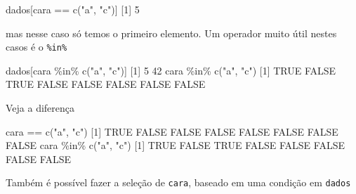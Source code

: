\documentclass[
  10pt,
  a4paper]{book}
\newenvironment{Shaded}{\begin{snugshade}}{\end{snugshade}}
\newcommand{\ConstantTok}[1]{\textcolor[rgb]{0.00,0.00,0.00}{#1}}
\newcommand{\DecValTok}[1]{\textcolor[rgb]{0.00,0.00,0.81}{#1}}
\newcommand{\FunctionTok}[1]{\textcolor[rgb]{0.00,0.00,0.00}{#1}}
\newcommand{\NormalTok}[1]{#1}
\newcommand{\SpecialCharTok}[1]{\textcolor[rgb]{0.00,0.00,0.00}{#1}}
\newcommand{\StringTok}[1]{\textcolor[rgb]{0.31,0.60,0.02}{#1}}
\begin{document}
\begin{Shaded}
\begin{Highlighting}[]
\NormalTok{dados[cara }\SpecialCharTok{==} \FunctionTok{c}\NormalTok{(}\StringTok{"a"}\NormalTok{, }\StringTok{"c"}\NormalTok{)]}
\NormalTok{[}\DecValTok{1}\NormalTok{] }\DecValTok{5}
\end{Highlighting}
\end{Shaded}

mas nesse caso só temos o primeiro elemento. Um operador muito útil
nestes casos é o \texttt{\%in\%}

\begin{Shaded}
\begin{Highlighting}[]
\NormalTok{dados[cara }\SpecialCharTok{\%in\%} \FunctionTok{c}\NormalTok{(}\StringTok{"a"}\NormalTok{, }\StringTok{"c"}\NormalTok{)]}
\NormalTok{[}\DecValTok{1}\NormalTok{]  }\DecValTok{5} \DecValTok{42}
\NormalTok{cara }\SpecialCharTok{\%in\%} \FunctionTok{c}\NormalTok{(}\StringTok{"a"}\NormalTok{, }\StringTok{"c"}\NormalTok{)}
\NormalTok{[}\DecValTok{1}\NormalTok{]  }\ConstantTok{TRUE} \ConstantTok{FALSE}  \ConstantTok{TRUE} \ConstantTok{FALSE} \ConstantTok{FALSE} \ConstantTok{FALSE} \ConstantTok{FALSE} \ConstantTok{FALSE}
\end{Highlighting}
\end{Shaded}

Veja a diferença

\begin{Shaded}
\begin{Highlighting}[]
\NormalTok{cara }\SpecialCharTok{==} \FunctionTok{c}\NormalTok{(}\StringTok{"a"}\NormalTok{, }\StringTok{"c"}\NormalTok{)}
\NormalTok{[}\DecValTok{1}\NormalTok{]  }\ConstantTok{TRUE} \ConstantTok{FALSE} \ConstantTok{FALSE} \ConstantTok{FALSE} \ConstantTok{FALSE} \ConstantTok{FALSE} \ConstantTok{FALSE} \ConstantTok{FALSE}
\NormalTok{cara }\SpecialCharTok{\%in\%} \FunctionTok{c}\NormalTok{(}\StringTok{"a"}\NormalTok{, }\StringTok{"c"}\NormalTok{)}
\NormalTok{[}\DecValTok{1}\NormalTok{]  }\ConstantTok{TRUE} \ConstantTok{FALSE}  \ConstantTok{TRUE} \ConstantTok{FALSE} \ConstantTok{FALSE} \ConstantTok{FALSE} \ConstantTok{FALSE} \ConstantTok{FALSE}
\end{Highlighting}
\end{Shaded}

Também é possível fazer a seleção de \texttt{cara}, baseado em uma condição em
\texttt{dados}
\end{document}
